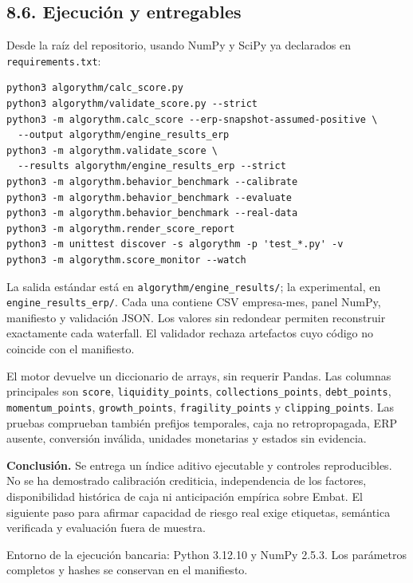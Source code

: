 \subsection*{8.6. Ejecución y entregables}
Desde la raíz del repositorio, usando NumPy y SciPy ya declarados en \texttt{requirements.txt}:
\begin{verbatim}
python3 algorythm/calc_score.py
python3 algorythm/validate_score.py --strict
python3 -m algorythm.calc_score --erp-snapshot-assumed-positive \
  --output algorythm/engine_results_erp
python3 -m algorythm.validate_score \
  --results algorythm/engine_results_erp --strict
python3 -m algorythm.behavior_benchmark --calibrate
python3 -m algorythm.behavior_benchmark --evaluate
python3 -m algorythm.behavior_benchmark --real-data
python3 -m algorythm.render_score_report
python3 -m unittest discover -s algorythm -p 'test_*.py' -v
python3 -m algorythm.score_monitor --watch
\end{verbatim}
La salida estándar está en \texttt{algorythm/engine\_results/}; la experimental, en \texttt{engine\_results\_erp/}. Cada una contiene CSV empresa-mes, panel NumPy, manifiesto y validación JSON. Los valores sin redondear permiten reconstruir exactamente cada waterfall. El validador rechaza artefactos cuyo código no coincide con el manifiesto.

El motor devuelve un diccionario de arrays, sin requerir Pandas. Las columnas principales son \texttt{score}, \texttt{liquidity\_points}, \texttt{collections\_points}, \texttt{debt\_points}, \texttt{momentum\_points}, \texttt{growth\_points}, \texttt{fragility\_points} y \texttt{clipping\_points}. Las pruebas comprueban también prefijos temporales, caja no retropropagada, ERP ausente, conversión inválida, unidades monetarias y estados sin evidencia.

\textbf{Conclusión.} Se entrega un índice aditivo ejecutable y controles reproducibles. No se ha demostrado calibración crediticia, independencia de los factores, disponibilidad histórica de caja ni anticipación empírica sobre Embat. El siguiente paso para afirmar capacidad de riesgo real exige etiquetas, semántica verificada y evaluación fuera de muestra.

Entorno de la ejecución bancaria: Python 3.12.10 y NumPy 2.5.3. Los parámetros completos y hashes se conservan en el manifiesto.
